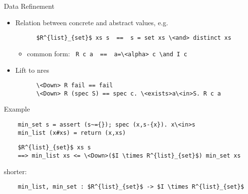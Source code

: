 \documentclass[fleqn]{beamer}
\begin{document}
\begin{frame}[fragile]{Data Refinement}
  \begin{itemize}
   \item Relation between concrete and abstract values, e.g.
    \begin{lstlisting}
      $R^{list}_{set}$ xs s  ==  s = set xs \<and> distinct xs
    \end{lstlisting}
    \begin{itemize}
     \item common form: \lstinline{ R c a  ==  a=\<alpha> c \and I c}
    \end{itemize}
   \item Lift to nres
    \begin{lstlisting}
      \<Down> R fail == fail
      \<Down> R (spec S) == spec c. \<exists>a\<in>S. R c a
    \end{lstlisting}

  \end{itemize}
\end{frame}
\begin{frame}[fragile]{Example}
  \begin{lstlisting}
    min_set s = assert (s~={}); spec (x,s-{x}). x\<in>s
    min_list (x#xs) = return (x,xs)
  \end{lstlisting}

  \begin{lstlisting}
    $R^{list}_{set}$ xs s
    ==> min_list xs <= \<Down>($I \times R^{list}_{set}$) min_set xs
  \end{lstlisting}

  shorter:
  \begin{lstlisting}
    min_list, min_set : $R^{list}_{set}$ -> $I \times R^{list}_{set}$
  \end{lstlisting}

\end{frame}
\end{document}
